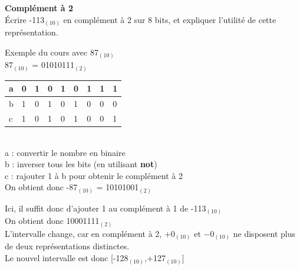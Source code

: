 \begin{Exercice}[5 minutes] \textbf{Complément à 2}\\
    Écrire -113$_{(10)}$ en complément à 2 sur 8 bits, et expliquer l'utilité de cette représentation. \\

    \begin{conseil}
    
    Exemple du cours avec 87$_{(10)}$ \\
    
    87$_{(10)}$ = 01010111$_{(2)}$ \\
    
         \begin{tabular}{| p{1cm} | p{1cm} | p{1cm} | p{1cm} | p{1cm} | p{1cm} | p{1cm} | p{1cm} | p{1cm} |} 
            \hline
            a & 0 & 1 & 0 & 1 & 0 & 1 & 1 & 1 \\ [0.5ex] 
            \hline
            b & 1 & 0 & 1 & 0 & 1 & 0 & 0 & 0 \\ [0.5ex]
            \hline
            c & 1 & 0 & 1 & 0 & 1 & 0 & 0 & 1 \\ [0.5ex]
            \hline
        \end{tabular} \\
        
        a : convertir le nombre en binaire \\
        
        b : inverser tous les bits (en utilisant \textbf{not}) \\
        
        c : rajouter 1 à b pour obtenir le complément à 2 \\
        
        On obtient donc -87$_{(10)}$ = 10101001$_{(2)}$ \\
    \end{conseil}
    
    \begin{solution}
    	Ici, il suffit donc d'ajouter 1 au complément à 1 de -113$_{(10)}$ \\
    	
    	On obtient donc 10001111$_{(2)}$ \\
    	
    	L'intervalle change, car en complément à 2, \(+0_{(10)}\) et \(-0_{(10)}\) ne disposent plus de deux représentations distinctes.\\
    	
    	Le nouvel intervalle est donc [-128$_{(10)}$,+127$_{(10)}$]
        
    \end{solution}
\end{Exercice}

